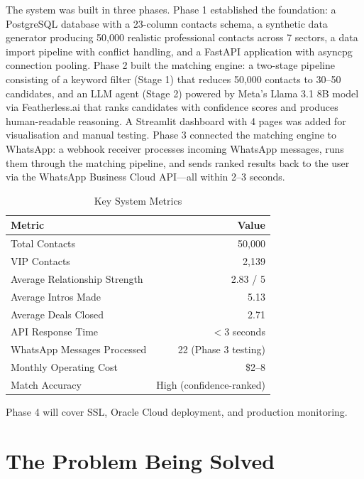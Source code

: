 \documentclass[12pt, a4paper]{report}
\begin{document}
The system was built in three phases. Phase 1 established the foundation: a PostgreSQL database with a 23-column contacts schema, a synthetic data generator producing 50,000 realistic professional contacts across 7 sectors, a data import pipeline with conflict handling, and a FastAPI application with asyncpg connection pooling. Phase 2 built the matching engine: a two-stage pipeline consisting of a keyword filter (Stage 1) that reduces 50,000 contacts to 30--50 candidates, and an LLM agent (Stage 2) powered by Meta's Llama 3.1 8B model via Featherless.ai that ranks candidates with confidence scores and produces human-readable reasoning. A Streamlit dashboard with 4 pages was added for visualisation and manual testing. Phase 3 connected the matching engine to WhatsApp: a webhook receiver processes incoming WhatsApp messages, runs them through the matching pipeline, and sends ranked results back to the user via the WhatsApp Business Cloud API---all within 2--3 seconds.

\begin{table}[H]
\centering
\begin{tabular}{lr}
\toprule
\textbf{Metric} & \textbf{Value} \\
\midrule
Total Contacts & 50,000 \\
VIP Contacts & 2,139 \\
Average Relationship Strength & 2.83 / 5 \\
Average Intros Made & 5.13 \\
Average Deals Closed & 2.71 \\
API Response Time & $<$3 seconds \\
WhatsApp Messages Processed & 22 (Phase 3 testing) \\
Monthly Operating Cost & \$2--8 \\
Match Accuracy & High (confidence-ranked) \\
\bottomrule
\end{tabular}
\caption{Key System Metrics}
\end{table}

Phase 4 will cover SSL, Oracle Cloud deployment, and production monitoring.

\chapter{The Problem Being Solved}
\end{document}

